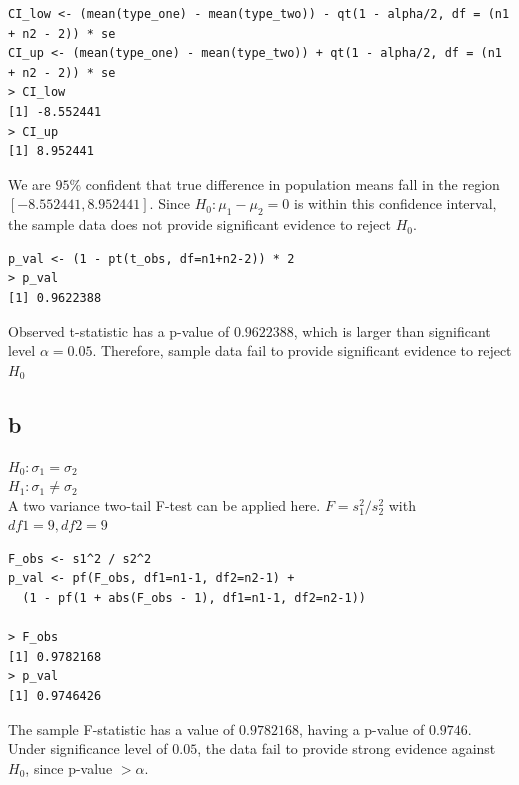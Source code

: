 \documentclass[11pt,letterpaper]{article}
\begin{document}
\begin{verbatim}
CI_low <- (mean(type_one) - mean(type_two)) - qt(1 - alpha/2, df = (n1 + n2 - 2)) * se
CI_up <- (mean(type_one) - mean(type_two)) + qt(1 - alpha/2, df = (n1 + n2 - 2)) * se
> CI_low
[1] -8.552441
> CI_up
[1] 8.952441
\end{verbatim}

\noindent We are $95 \%$ confident that true difference in population means fall in the region $[-8.552441, 8.952441]$. Since $H_0: \mu_1 - \mu_2 = 0$ is within this confidence interval, the sample data does not provide significant evidence to reject $H_0$.

\begin{verbatim}
p_val <- (1 - pt(t_obs, df=n1+n2-2)) * 2
> p_val
[1] 0.9622388
\end{verbatim}

\noindent Observed t-statistic has a p-value of $0.9622388$, which is larger than significant level $\alpha = 0.05$. Therefore, sample data fail to provide significant evidence to reject $H_0$

\subsection*{b}
\noindent $H_0: \sigma_1 = \sigma_2$ \\
\noindent $H_1: \sigma_1 \neq \sigma_2$ \\

\noindent A two variance two-tail F-test can be applied here. $F = s_1^2 /s_2^2$ with $df1= 9, df2= 9$
\begin{verbatim}
F_obs <- s1^2 / s2^2
p_val <- pf(F_obs, df1=n1-1, df2=n2-1) +
  (1 - pf(1 + abs(F_obs - 1), df1=n1-1, df2=n2-1))

> F_obs
[1] 0.9782168
> p_val
[1] 0.9746426
\end{verbatim}
The sample F-statistic has a value of $0.9782168$, having a p-value of $0.9746$. Under significance level of $0.05$, the data fail to provide strong evidence against $H_0$, since p-value $> \alpha$.  \\
\end{document}
